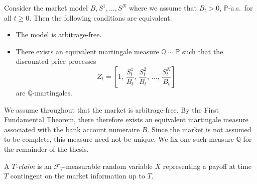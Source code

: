 

\begin{theorem}
    Consider the market model $B, S^1, \ldots, S^N$ where we assume that $B_t > 0$, $\mathbb{P}$-a.s.\ for all $t \geq 0$. Then the following conditions are equivalent:
    \begin{itemize}
        \item The model is arbitrage-free.
        \item There exists an equivalent martingale measure $\mathbb{Q} \sim \mathbb{P}$ such that the discounted price processes
        \[
            Z_t = \left[1,\, \frac{S_t^1}{B_t},\, \frac{S_t^2}{B_t},\, \ldots,\, \frac{S_t^N}{B_t}\right]
        \]
        are $\mathbb{Q}$-martingales.
    \end{itemize}
\end{theorem}





We assume throughout that the market is arbitrage-free. By the First Fundamental Theorem, there therefore exists an equivalent martingale measure associated with the bank account numeraire $B$. Since the market is not assumed to be complete, this measure need not be unique. We fix one such measure $\mathbb{Q}$ for the remainder of the thesis.

A \emph{$T$-claim} is an $\mathcal{F}_T$-measurable random variable $X$ representing a payoff at time $T$ contingent on the market information up to $T$.

